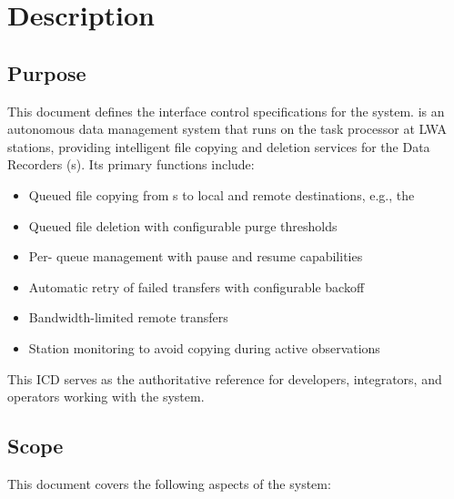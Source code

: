 
\chapter{Description}
\label{sec:description}

\section{Purpose}

This document defines the interface control specifications for the \SC{} system. \SC{} is an autonomous data management system that runs on the \MCS{} task processor at LWA stations, providing intelligent file copying and deletion services for the Data Recorders (\DR{}s). Its primary functions include:

\begin{itemize}
    \item Queued file copying from \DR{}s to local and remote destinations, e.g., the \LWA{} \UCF{}
    \item Queued file deletion with configurable purge thresholds
    \item Per-\DR{} queue management with pause and resume capabilities
    \item Automatic retry of failed transfers with configurable backoff
    \item Bandwidth-limited remote transfers
    \item Station monitoring to avoid copying during active observations
\end{itemize}

This ICD serves as the authoritative reference for developers, integrators, and operators working with the \SC{} system.

\section{Scope}

This document covers the following aspects of the \SC{} system:

